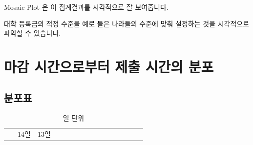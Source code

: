 \documentclass[
]{book}
\begin{document}
Mosaic Plot 은 이 집계결과를 시각적으로 잘 보여줍니다.

대학 등록금의 적정 수준을 예로 들은 나라들의 수준에 맞춰 설정하는 것을 시각적으로 파악할 수 있습니다.

\section{마감 시간으로부터 제출 시간의 분포}\label{uxb9c8uxac10-uxc2dcuxac04uxc73cuxb85cuxbd80uxd130-uxc81cuxcd9c-uxc2dcuxac04uxc758-uxbd84uxd3ec-16}

\subsection{분포표}\label{uxbd84uxd3ecuxd45c-17}

\begin{longtable}[]{@{}
  >{\raggedright\arraybackslash}p{}
  >{\centering\arraybackslash}p{}
  >{\centering\arraybackslash}p{}
  >{\centering\arraybackslash}p{}
  >{\centering\arraybackslash}p{}
  >{\centering\arraybackslash}p{}
  >{\centering\arraybackslash}p{}
  >{\centering\arraybackslash}p{}
  >{\centering\arraybackslash}p{}
  >{\centering\arraybackslash}p{}
  >{\centering\arraybackslash}p{}
  >{\centering\arraybackslash}p{}
  >{\centering\arraybackslash}p{}
  >{\centering\arraybackslash}p{}
  >{\centering\arraybackslash}p{}
  >{\centering\arraybackslash}p{}@{}}
\caption{일 단위}\tabularnewline
\toprule\noalign{}
\begin{minipage}[b]{\linewidth}\raggedright
~
\end{minipage} & \begin{minipage}[b]{\linewidth}\centering
14일
\end{minipage} & \begin{minipage}[b]{\linewidth}\centering
13일
\end{minipage} & \begin{minipage}[b]{\linewidth}\centering

\end{minipage}
\end{longtable}
\end{document}
